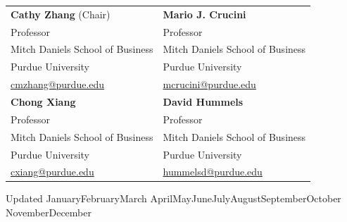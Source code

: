 \documentclass[11pt]{article}
\newcommand{\monthyear}{\ifcase\month\or January\or February\or March\or
  April\or May\or June\or July\or August\or September\or October\or
  November\or December\fi\ \number\year}
\begin{document}
\begin{tabular}{@{}p{}p{}@{}}
\textbf{Cathy Zhang} (Chair) & \textbf{Mario J. Crucini}\\
Professor & Professor\\
Mitch Daniels School of Business & Mitch Daniels School of Business\\
Purdue University & Purdue University\\
\href{mailto:cmzhang@purdue.edu}{cmzhang@purdue.edu} & \href{mailto:mcrucini@purdue.edu}{mcrucini@purdue.edu}\\[0.8em]
\textbf{Chong Xiang} & \textbf{David Hummels}\\
Professor & Professor\\
Mitch Daniels School of Business & Mitch Daniels School of Business\\
Purdue University & Purdue University\\
\href{mailto:cxiang@purdue.edu}{cxiang@purdue.edu} & \href{mailto:hummelsd@purdue.edu}{hummelsd@purdue.edu}\\
\end{tabular}

\vfill
\begin{center}\footnotesize Updated \monthyear\end{center}
\end{document}
